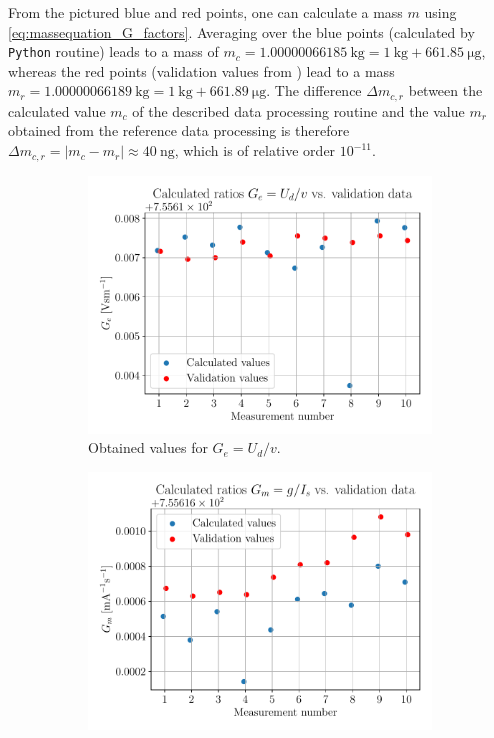 \documentclass{report}
\numberwithin{tm}{section}
\begin{document}
From the pictured blue and red points, one can calculate a mass $m$ using \cref{eq:massequation_G_factors}. Averaging over the blue points (calculated by \verb|Python| routine) leads to a mass of $m_c = \SI{1.00000066185}{\kilogram} = \SI{1}{\kilogram} + \SI{661.85}{\micro\gram}$, whereas the red points (validation values from \cite{Eichenberger_2022}) lead to a mass $m_r = \SI{1.00000066189}{\kilogram} = \SI{1}{\kilogram} + \SI{661.89}{\micro\gram}$. The difference $\Delta m_{c,r}$ between the calculated value $m_c$ of the described data processing routine and the value $m_r$ obtained from the reference data processing is therefore $\Delta m_{c,r} = |m_c-m_r| \approx \SI{40}{\nano\gram}$, which is of relative order $10^{-11}$.
\begin{figure}[h]
	\centering
	\begin{subfigure}{0.49\textwidth}
		 \centering
		 \includegraphics[width=\textwidth]{figures/u_v_example.pdf}
		 \caption{Obtained values for $G_e =U_d/v$.}
		 \label{fig:example_u_v}
	\end{subfigure}
	\hfill
	\begin{subfigure}{0.49\textwidth}
		\centering
		\includegraphics[width=\textwidth]{figures/g_i_example.pdf}

\end{subfigure}
\end{figure}
\end{document}
